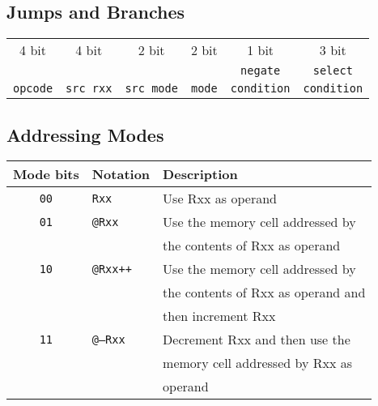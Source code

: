 \documentclass{leaflet}
\begin{document}
  \subsection{Jumps and Branches}
   {\scriptsize
    \begin{center}
     \begin{longtable}{|c||c|c||c||c|c|}
      \hline
      4 bit&4 bit&2 bit&2 bit&1 bit&3 bit\\
      &     &     &     &{\tt negate}&{\tt select}\\
      {\tt opcode}&{\tt src rxx}&{\tt src mode}&
      {\tt mode}&{\tt condition}&{\tt condition}\\
      \hline
     \end{longtable}
    \end{center}
   }
%
  \subsection{Addressing Modes}
   {\scriptsize
    \begin{center}
     \begin{longtable}{|c|l|l|}
      \hline
       Mode bits&Notation&Description\\
      \hline
       {\tt 00}&{\tt Rxx}&Use Rxx as operand\\
       {\tt 01}&{\tt @Rxx}&Use the memory cell addressed by\\
               &          &the contents of Rxx as operand\\
       {\tt 10}&{\tt @Rxx++}&Use the memory cell addressed by\\
               &          &the contents of Rxx as operand and\\
               &          &then increment Rxx\\
       {\tt 11}&{\tt @--Rxx}&Decrement Rxx and then use the\\
               &          &memory cell addressed by Rxx as\\
               &          &operand\\
      \hline
     \end{longtable}
    \end{center}
   }
%
\end{document}
